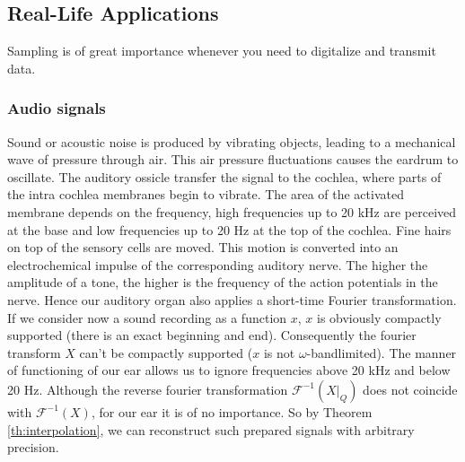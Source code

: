 \documentclass[a4paper, 11pt]{scrreprt}
\newcommand{\FF}{\mathcal{F}}
\newcommand{\student}[1]{\marginnote{{\normalfont\bf #1}}}
\begin{document}
\newpage

\subsection{Real-Life Applications}
\student{Andreas}
\label{se:real-life}
Sampling is of great importance whenever you need to digitalize and transmit data. 
\subsubsection{Audio signals}
Sound or acoustic noise is produced by vibrating objects, leading to a mechanical wave of pressure through air. This air pressure fluctuations causes the eardrum to oscillate. The auditory ossicle transfer the signal to the cochlea, where parts of the intra cochlea membranes begin to vibrate. The area of the activated membrane depends on the frequency, high frequencies up to 20 kHz are perceived at the base and low frequencies up to 20 Hz at the top of the cochlea. Fine hairs on top of the sensory cells are moved. This motion is converted into an electrochemical impulse of the corresponding auditory nerve. The higher the amplitude of a tone, the higher is the frequency of the action potentials in the nerve.
Hence our auditory organ also applies a short-time Fourier transformation. \\

If we consider now a sound recording as a function $x$, $x$ is obviously compactly supported (there is an exact beginning and end). Consequently the fourier transform $X$ can't be compactly supported ($x$ is not $\omega$-bandlimited). The manner of functioning of our ear allows us to ignore frequencies above 20 kHz and below 20 Hz. Although the reverse fourier transformation $\FF^{-1}(X|_{Q})$ does not coincide with $\FF^{-1}(X)$, for our ear it is of no importance. So by Theorem \ref{th:interpolation}, we can reconstruct such prepared signals with arbitrary precision. 
\end{document}
